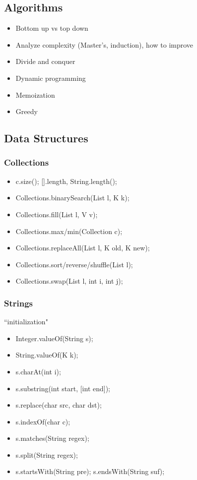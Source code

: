 \documentclass[10pt]{article}
\begin{document}
\subsection{Algorithms}
\begin{itemize}
    \itemsep0em
    \item Bottom up vs top down
    \item Analyze complexity (Master's, induction), how to improve
    \item Divide and conquer
    \item Dynamic programming
    \item Memoization
    \item Greedy
\end{itemize}

\subsection{Data Structures}
\subsubsection{Collections}
\begin{itemize}
    \itemsep0em
    \item c.size(); [].length, String.length();
    \item Collections.binarySearch(List l, K k);
    \item Collections.fill(List l, V v);
    \item Collections.max/min(Collection c);
    \item Collections.replaceAll(List l, K old, K new);
    \item Collections.sort/reverse/shuffle(List l);
    \item Collections.swap(List l, int i, int j);
\end{itemize}
\subsubsection{Strings}
``initialization"
\begin{itemize}
    \itemsep0em
    \item Integer.valueOf(String s);
    \item String.valueOf(K k);
    \item s.charAt(int i);
    \item s.substring(int start, [int end]);
    \item s.replace(char src, char dst);
    \item s.indexOf(char c);
    \item s.matches(String regex);
    \item s.split(String regex);
    \item s.startsWith(String pre); s.endsWith(String suf);
\end{itemize}
\end{document}

